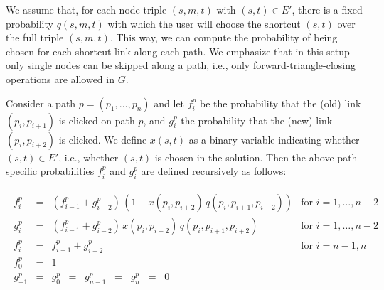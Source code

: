 \documentclass[11pt,letterpaper]{article}
\begin{document}
We assume that, for each node triple $(s,m,t)$ with $(s,t) \in E'$, there is a fixed probability $q(s,m,t)$ with which the user will choose the shortcut $(s,t)$ over the full triple $(s,m,t)$.
This way, we can compute the probability of being chosen for each shortcut link along each path.
We emphasize that in this setup only single nodes can be skipped along a path, i.e., only forward\hyp triangle\hyp closing operations are allowed in $G$.

Consider a path $p=(p_1,\dots,p_n)$ and let $f^p_i$ be the probability that the (old) link $(p_i,p_{i+1})$ is clicked on path $p$, and $g^p_i$ the probability that the (new) link $(p_i,p_{i+2})$ is clicked.
We define $x(s,t)$ as a binary variable indicating whether $(s,t) \in E'$, i.e., whether $(s,t)$ is chosen in the solution.
Then the above path\hyp specific probabilities $f^p_i$ and $g^p_i$ are defined recursively as follows:

\begin{eqnarray}
\begin{array}{llll}
f^p_i &=& \left(f^p_{i-1} + g^p_{i-2}\right) \, (1 - x(p_i,p_{i+2}) \, q(p_i,p_{i+1},p_{i+2})) & \mbox{for $i=1,\dots,n-2$} \\
g^p_i &=& \left(f^p_{i-1} + g^p_{i-2}\right) \, x(p_i,p_{i+2}) \, q(p_i,p_{i+1},p_{i+2}) & \mbox{for $i=1,\dots,n-2$} \\
f^p_{i} &=& f^p_{i-1} + g^p_{i-2} & \mbox{for $i=n-1,n$} \\
f^p_0 &=& 1 & \\
g^p_{-1} &=& g^p_0 \;\;=\;\; g^p_{n-1} \;\;=\;\; g^p_n \;\;=\;\; 0 &
\end{array}
\label{eqn:f_and_g}
\end{eqnarray}
\end{document}
